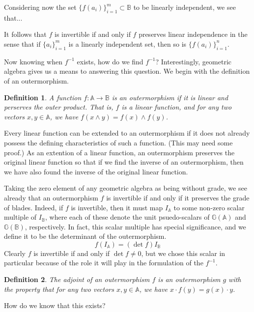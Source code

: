 \documentclass[12pt]{article}
\newcommand{\G}{\mathbb{G}}
\newcommand{\A}{\mathbb{A}}
\newcommand{\B}{\mathbb{B}}
\newtheorem{definition}{Definition}[section]
\begin{document}
Considering now the set $\{f(a_i)\}_{i=1}^m\subset\B$ to be linearly independent, we
see that...

 It follows that $f$ is invertible if and only if $f$ preserves linear independence
in the sense that if $\{a_i\}_{i=1}^m$ is a linearly independent set, then so is $\{f(a_i)\}_{i=1}^n$.

Now knowing when $f^{-1}$ exists, how do we find $f^{-1}$?  Interestingly, geometric
algebra gives us a means to answering this question.  We begin with the definition
of an outermorphism.
\begin{definition}
A function $f:\A\to\B$ is an outermorphism if it is linear and perserves the outer product.  That is,
$f$ is a linear function, and for any two vectors $x,y\in\A$, we have $f(x\wedge y)=f(x)\wedge f(y)$.
\end{definition}
Every linear function can be extended to an outermorphism if it does not already possess the
defining characteristics of such a function.  (This may need some proof.)  As an extention of a linear function, an
outermorphism preserves the original linear function so that if we find the inverse of
an outermorphism, then we have also found the inverse of the original linear function.

Taking the zero element of any geometric algebra as being without grade, we see already
that an outermorphism $f$ is invertible if and only if it preserves the grade of blades.  Indeed,
if $f$ is invertible, then it must map $I_{\A}$ to some non-zero scalar multiple of $I_{\B}$,
where each of these denote the unit psuedo-scalars of $\G(\A)$ and $\G(\B)$, respectively.
In fact, this scalar multiple has special significance, and we define it to be the determinant
of the outermorphism.
\begin{equation*}
f(I_{\A}) = (\det f)I_{\B}
\end{equation*}
Clearly $f$ is invertible if and only if $\det f\neq 0$, but we chose this scalar in particular
because of the role it will play in the formulation of the $f^{-1}$.
\begin{definition}
The adjoint of an outermorphism $f$ is an outermorphism $g$ with the property that
for any two vectors $x,y\in\A$, we have $x\cdot f(y)=g(x)\cdot y$.
\end{definition}
How do we know that this exists?
\end{document}
